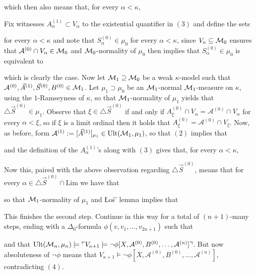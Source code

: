 \documentclass[../main]{subfiles}
\begin{document}
{which then also means that, for every $\alpha<\kappa$,

Fix witnesses $A^{(1)}_\alpha\subset V_\alpha$ to the existential quantifier in $(3)$ and define the sets

for every $\alpha<\kappa$ and note that $S_\alpha^{(0)}\in\mu_0$ for every $\alpha<\kappa$, since $V_\kappa\subseteq\operatorname{\mathcal M}_0$ ensures that $\mathcal A^{(0)}\cap V_\alpha\in\operatorname{\mathcal M}_0$ and $\operatorname{\mathcal M}_0$-normality of $\mu_0$ then implies that $S_\alpha^{(0)}\in\mu_0$ is equivalent to

which is clearly the case. Now let $\operatorname{\mathcal M}_1\supseteq\operatorname{\mathcal M}_0$ be a weak $\kappa$-model such that $\mathcal A^{(0)},\vec A^{(1)},\vec S^{(0)},B^{(0)}\in\operatorname{\mathcal M}_1$. Let $\mu_1\supset\mu_0$ be an $\operatorname{\mathcal M}_1$-normal $\operatorname{\mathcal M}_1$-measure on $\kappa$, using the $1$-Ramseyness of $\kappa$, so that $\operatorname{\mathcal M}_1$-normality of $\mu_1$ yields that $\triangle\vec S^{(0)}\in\mu_1$. Observe that $\xi\in\triangle\vec S^{(0)}$ if and only if $A^{(0)}_\xi\cap V_\alpha=\mathcal A^{(0)}\cap V_\alpha$ for every $\alpha<\xi$, so if $\xi$ is a limit ordinal then it holds that $A^{(0)}_\xi=\mathcal A^{(0)}\cap V_\xi$. Now, as before, form $\mathcal A^{(1)}:=[\vec A^{(1)}]_{\mu_1}\in\operatorname{Ult}(\operatorname{\mathcal M}_1,\mu_1)$, so that $(2)$ implies that

and the definition of the $A_\alpha^{(1)}$'s along with $(3)$ gives that, for every $\alpha<\kappa$,

Now this, paired with the above observation regarding $\triangle\vec S^{(0)}$, means that for every $\alpha\in\triangle\vec S^{(0)}\cap\text{Lim}$ we have that

so that $\operatorname{\mathcal M}_1$-normality of $\mu_1$ and \L o\' s' lemma implies that

This finishes the second step. Continue in this way for a total of $(n+1)$-many steps, ending with a $\Delta_0$-formula $\phi(v,v_1,\hdots,v_{2n+1})$ such that

and that $\operatorname{Ult}(\operatorname{\mathcal M}_n,\mu_n)\models\ulcorner V_{\kappa+1}\models\lnot\phi[X,\mathcal A^{(0)},B^{(0)},\hdots,\mathcal A^{(n)}] \urcorner$. But now absoluteness of $\lnot\phi$ means that $V_{\kappa+1}\models\lnot\phi[X,\mathcal A^{(0)},B^{(0)},\hdots,\mathcal A^{(n)}]$, contradicting $(4)$.
}
\end{document}
